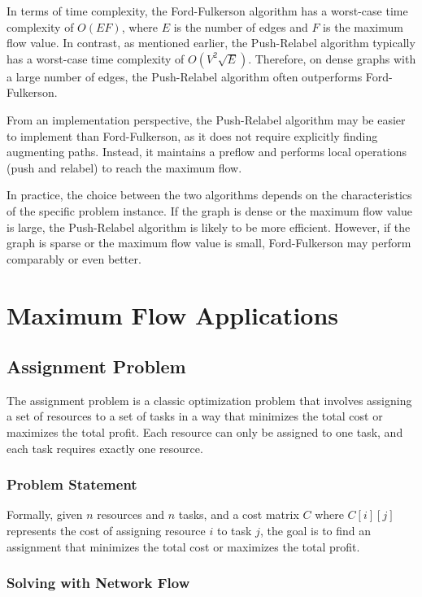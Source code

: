 \documentclass[12pt]{book} %
\begin{document}
In terms of time complexity, the Ford-Fulkerson algorithm has a worst-case time complexity of \(O(EF)\), where \(E\) is the number of edges and \(F\) is the maximum flow value. In contrast, as mentioned earlier, the Push-Relabel algorithm typically has a worst-case time complexity of \(O(V^2 \sqrt{E})\). Therefore, on dense graphs with a large number of edges, the Push-Relabel algorithm often outperforms Ford-Fulkerson.

From an implementation perspective, the Push-Relabel algorithm may be easier to implement than Ford-Fulkerson, as it does not require explicitly finding augmenting paths. Instead, it maintains a preflow and performs local operations (push and relabel) to reach the maximum flow.

In practice, the choice between the two algorithms depends on the characteristics of the specific problem instance. If the graph is dense or the maximum flow value is large, the Push-Relabel algorithm is likely to be more efficient. However, if the graph is sparse or the maximum flow value is small, Ford-Fulkerson may perform comparably or even better.


\section{Maximum Flow Applications}

\subsection{Assignment Problem}
The assignment problem is a classic optimization problem that involves assigning a set of resources to a set of tasks in a way that minimizes the total cost or maximizes the total profit. Each resource can only be assigned to one task, and each task requires exactly one resource.
\subsubsection{Problem Statement}
Formally, given \(n\) resources and \(n\) tasks, and a cost matrix \(C\) where \(C[i][j]\) represents the cost of assigning resource \(i\) to task \(j\), the goal is to find an assignment that minimizes the total cost or maximizes the total profit.

\subsubsection{Solving with Network Flow}
\end{document}
